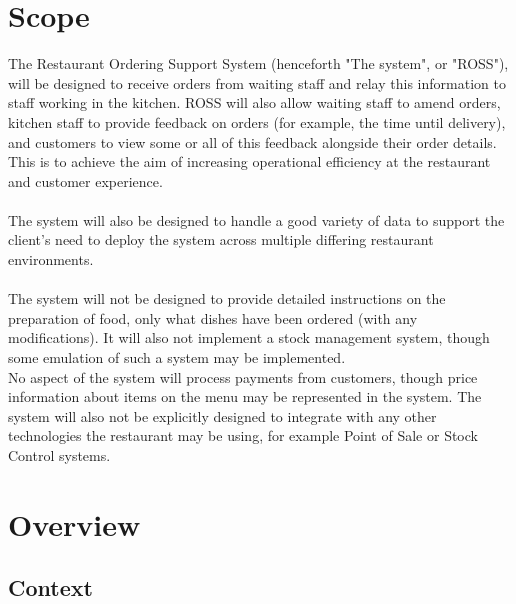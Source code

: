 \documentclass[11pt, a4paper]{report}
\begin{document}
\section{Scope} \label{sec:Scope}
The Restaurant Ordering Support System (henceforth "The system", or "ROSS"), will be designed to receive orders from waiting staff and relay this information to staff working in the kitchen. ROSS will also allow waiting staff to amend orders, kitchen staff to provide feedback on orders (for example, the time until delivery), and customers to view some or all of this feedback alongside their order details. This is to achieve the aim of increasing operational efficiency at the restaurant and customer experience.\\
\\
The system will also be designed to handle a good variety of data to support the client's need to deploy the system across multiple differing restaurant environments.\\
\\
The system will not be designed to provide detailed instructions on the preparation of food, only what dishes have been ordered (with any modifications). It will also not implement a stock management system, though some emulation of such a system may be implemented.\\
No aspect of the system will process payments from customers, though price information about items on the menu may be represented in the system. The system will also not be explicitly designed to integrate with any other technologies the restaurant may be using, for example Point of Sale or Stock Control systems.

\section{Overview} \label{sec:Overview}
\subsection{Context} \label{subsec:Context}
\end{document}
